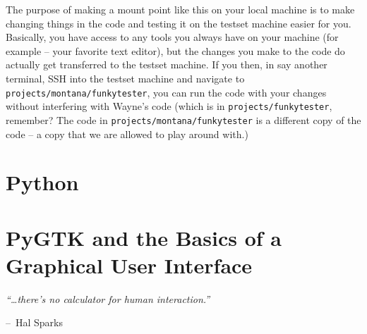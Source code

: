 \documentclass{report}
\makeatletter
\newenvironment{chapquote}[2][2em]
  {\setlength{\@tempdima}{#1}%
   \def\chapquote@author{#2}%
   \parshape 1 \@tempdima \dimexpr\textwidth-2\@tempdima\relax%
   \itshape}
  {\par\normalfont\hfill--\ \chapquote@author\hspace*{\@tempdima}\par\bigskip}
\makeatother
\begin{document}
\begin{appendices}
The purpose of making a mount point like this on your local machine is to make changing things in the code and testing it on the testset machine easier for you. Basically, you have access to any tools you always have on your machine (for example -- your favorite text editor), but the changes you make to the code do actually get transferred to the testset machine. If you then, in say another terminal, SSH into the testset machine and navigate to \texttt{projects/montana/funkytester}, you can run the code with your changes without interfering with Wayne's code (which is in \texttt{projects/funkytester}, remember? The code in \texttt{projects/montana/funkytester} is a different copy of the code -- a copy that we are allowed to play around with.)

\chapter{Python} \label{app:python}




\chapter{PyGTK and the Basics of a Graphical User Interface} \label{app:GTK}
\begin{chapquote}{Hal Sparks \textit{}}
``\ldots there's no calculator for human interaction.''
\end{chapquote}

\end{appendices}
\end{document}
